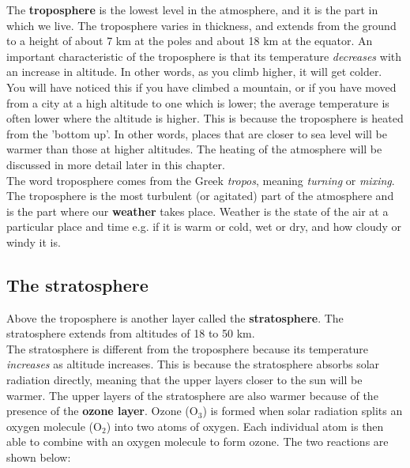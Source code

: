 The \textbf{troposphere} is the lowest level in the atmosphere, and it is the part in which we live. The troposphere varies in thickness, and extends from the ground to a height of about 7 km at the poles and about 18 km at the equator. An important characteristic of the troposphere is that its temperature \textit{decreases} with an increase in altitude. In other words, as you climb higher, it will get colder. 
You will have noticed this if you have climbed a mountain, or if you have moved from a city at a high altitude to one which is lower; the average temperature is often lower where the altitude is higher. 
This is because the troposphere is heated from the 'bottom up'. In other words, places that are closer to sea level will be warmer than those at higher altitudes. The heating of the atmosphere will be discussed in more detail later in this chapter.\\

The word troposphere comes from the Greek \textit{tropos}, meaning \textit{turning} or \textit{mixing}. The troposphere is the most turbulent (or agitated) part of the atmosphere and is the part where our \textbf{weather} takes place. Weather is the state of the air at a particular place and time e.g. if it is warm or cold, wet or dry, and how cloudy or windy it is. 

\subsection{The stratosphere}

Above the troposphere is another layer called the \textbf{stratosphere}. The stratosphere extends from altitudes of 18 to 50 km.  \\

The stratosphere is different from the troposphere because its temperature \textit{increases} as altitude increases. This is because the stratosphere absorbs solar radiation directly, meaning that the upper layers closer to the sun will be warmer. The upper layers of the stratosphere are also warmer because of the presence of the \textbf{ozone layer}. Ozone (O$_{3}$) is formed when solar radiation splits an oxygen molecule (O$_{2}$) into two atoms of oxygen. Each individual atom is then able to combine with an oxygen molecule to form ozone. The two reactions are shown below:


